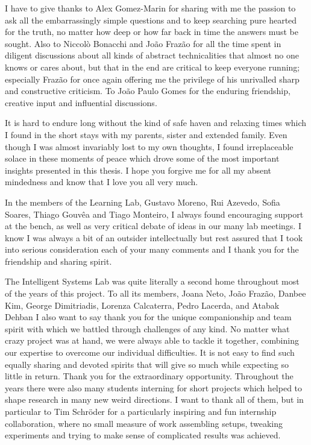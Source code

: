I have to give thanks to Alex Gomez-Marin for sharing with me the passion to ask all the embarrassingly simple questions and to keep searching pure hearted for the truth, no matter how deep or how far back in time the answers must be sought. Also to Niccolò Bonacchi and João Frazão for all the time spent in diligent discussions about all kinds of abstract technicalities that almost no one knows or cares about, but that in the end are critical to keep everyone running; especially Frazão for once again offering me the privilege of his unrivalled sharp and constructive criticism. To João Paulo Gomes for the enduring friendship, creative input and influential discussions.

It is hard to endure long without the kind of safe haven and relaxing times which I found in the short stays with my parents, sister and extended family. Even though I was almost invariably lost to my own thoughts, I found irreplaceable solace in these moments of peace which drove some of the most important insights presented in this thesis. I hope you forgive me for all my absent mindedness and know that I love you all very much.

In the members of the Learning Lab, Gustavo Moreno, Rui Azevedo, Sofia Soares, Thiago Gouvêa and Tiago Monteiro, I always found encouraging support at the bench, as well as very critical debate of ideas in our many lab meetings. I know I was always a bit of an outsider intellectually but rest assured that I took into serious consideration each of your many comments and I thank you for the friendship and sharing spirit. 

The Intelligent Systems Lab was quite literally a second home throughout most of the years of this project. To all its members, Joana Neto, João Frazão, Danbee Kim, George Dimitriadis, Lorenza Calcaterra, Pedro Lacerda, and Atabak Dehban I also want to say thank you for the unique companionship and team spirit with which we battled through challenges of any kind. No matter what crazy project was at hand, we were always able to tackle it together, combining our expertise to overcome our individual difficulties. It is not easy to find such equally sharing and devoted spirits that will give so much while expecting so little in return. Thank you for the extraordinary opportunity. Throughout the years there were also many students interning for short projects which helped to shape research in many new weird directions. I want to thank all of them, but in particular to Tim Schröder for a particularly inspiring and fun internship collaboration, where no small measure of work assembling setups, tweaking experiments and trying to make sense of complicated results was achieved.

